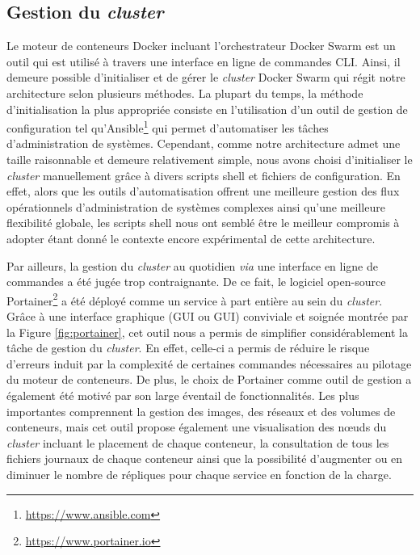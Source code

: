 \subsection{Gestion du \textit{cluster}}

Le moteur de conteneurs Docker incluant l'orchestrateur Docker Swarm est un outil qui est utilisé à travers une interface en ligne de commandes \acs{CLI}. Ainsi, il demeure possible d'initialiser et de gérer le \textit{cluster} Docker Swarm qui régit notre architecture selon plusieurs méthodes. La plupart du temps, la méthode d'initialisation la plus appropriée consiste en l'utilisation d'un outil de gestion de configuration tel qu'Ansible\footnote{\url{https://www.ansible.com}} qui permet d'automatiser les tâches d'administration de systèmes. Cependant, comme notre architecture admet une taille raisonnable et demeure relativement simple, nous avons choisi d'initialiser le \textit{cluster} manuellement grâce à divers scripts shell et fichiers de configuration. En effet, alors que les outils d'automatisation offrent une meilleure gestion des flux opérationnels d'administration de systèmes complexes ainsi qu'une meilleure flexibilité globale, les scripts shell nous ont semblé être le meilleur compromis à adopter étant donné le contexte encore expérimental de cette architecture.

Par ailleurs, la gestion du \textit{cluster} au quotidien \textit{via} une interface en ligne de commandes a été jugée trop contraignante. De ce fait, le logiciel open-source Portainer\footnote{\url{https://www.portainer.io}} a été déployé comme un service à part entière au sein du \textit{cluster}. Grâce à une interface graphique (\acl{GUI} ou \acs{GUI}) conviviale et soignée montrée par la Figure \ref{fig:portainer}, cet outil nous a permis de simplifier considérablement la tâche de gestion du \textit{cluster}. En effet, celle-ci a permis de réduire le risque d'erreurs induit par la complexité de certaines commandes nécessaires au pilotage du moteur de conteneurs. De plus, le choix de Portainer comme outil de gestion a également été motivé par son large éventail de fonctionnalités. Les plus importantes comprennent la gestion des images, des réseaux et des volumes de conteneurs, mais cet outil propose également une visualisation des n\oe{}uds du \textit{cluster} incluant le placement de chaque conteneur, la consultation de tous les fichiers journaux de chaque conteneur ainsi que la possibilité d'augmenter ou en diminuer le nombre de répliques pour chaque service en fonction de la charge.

